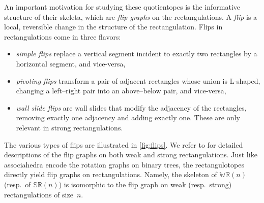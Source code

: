 \documentclass{amsart}
\theoremstyle{definition}
\newcommand{\darkblue}{\color{darkblue}} %
\newcommand{\defn}[1]{\textsl{\darkblue #1}} %
\newcommand{\polytope}[1]{\mathds{#1}} %
\newcommand{\WRP}{\polytope{WR}} %
\newcommand{\SRP}{\polytope{SR}} %
\begin{document}
An important motivation for studying these quotientopes is the informative structure of their skeleta, which are \defn{flip graphs} on the rectangulations.
A \defn{flip} is a local, reversible change in the structure of the rectangulation.
Flips in rectangulations come in three flavors:
\begin{itemize}
\item \defn{simple flips} replace a vertical segment incident to exactly two rectangles by a horizontal segment, and vice-versa,
\item \defn{pivoting flips} transform a pair of adjacent rectangles whose union is L-shaped, changing a left--right pair into an above--below pair, and vice-versa,
\item \defn{wall slide flips} are wall slides that modify the adjacency of the rectangles, removing exactly one adjacency and adding exactly one. These are only relevant in strong rectangulations.
\end{itemize}
The various types of flips are illustrated in \cref{fig:flips}.
We refer to \cite{MR2871762,MR3878132,MR3697823,ACFF24} for detailed descriptions of the flip graphs on both weak and strong rectangulations.
Just like associahedra encode the rotation graphs on binary trees, the rectangulotopes directly yield flip graphs on rectangulations.
Namely, the skeleton of $\WRP(n)$ (resp.~of $\SRP(n)$) is isomorphic to the flip graph on weak (resp.~strong) rectangulations of size~$n$.
\end{document}

